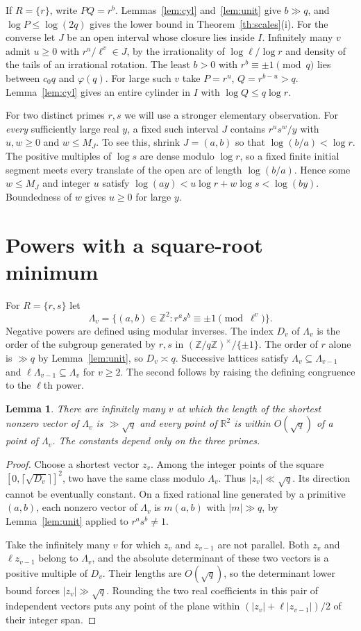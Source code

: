 \documentclass[11pt]{article}
\newtheorem{lemma}[theorem]{Lemma}
\newcommand{\R}{\mathbb R}
\newcommand{\Z}{\mathbb Z}
\newcommand{\sgnunit}{\{\pm1\}}
\begin{document}
If $R=\{r\}$, write $P Q=r^b$. Lemmas~\ref{lem:cyl} and~\ref{lem:unit}
give $b\gg q$, and $\log P\le\log(2q)$ gives the lower bound in
Theorem~\ref{th:scales}(i). For the converse let $J$ be an open interval
whose closure lies inside $I$. Infinitely many $v$ admit $u\ge0$ with
$r^u/\ell^v\in J$, by the irrationality of $\log\ell/\log r$ and density
of the tails of an irrational rotation. The least $b>0$ with
$r^b\equiv\pm1\pmod q$ lies between $c_0q$ and $\varphi(q)$. For large
such $v$ take $P=r^u$, $Q=r^{b-u}>q$. Lemma~\ref{lem:cyl} gives an
entire cylinder in $I$ with $\log Q\le q\log r$.

For two distinct primes $r,s$ we will use a stronger elementary
observation. For \emph{every} sufficiently large real $y$, a fixed such
interval $J$ contains $r^u s^w/y$ with $u,w\ge0$ and $w\le M_J$.
To see this, shrink $J=(a,b)$ so that $\log(b/a)<\log r$.
The positive multiples of $\log s$ are dense modulo $\log r$, so a
fixed finite initial segment meets every translate of the open arc of
length $\log(b/a)$. Hence some $w\le M_J$ and integer $u$ satisfy
$\log(ay)<u\log r+w\log s<\log(by)$. Boundedness of $w$ gives $u\ge0$
for large $y$.

\section{Powers with a square-root minimum}
For $R=\{r,s\}$ let
\[
 \Lambda_v=\{(a,b)\in\Z^2:r^a s^b\equiv\pm1\pmod{\ell^v}\}.
\]
Negative powers are defined using modular inverses. The index $D_v$ of
$\Lambda_v$ is the order of the subgroup generated by $r,s$ in
$(\Z/q\Z)^\times/\sgnunit$. The order of $r$ alone is $\gg q$ by
Lemma~\ref{lem:unit}, so $D_v\asymp q$. Successive lattices satisfy
$\Lambda_v\subseteq\Lambda_{v-1}$ and
$\ell\Lambda_{v-1}\subseteq\Lambda_v$ for $v\ge2$. The second follows
by raising the defining congruence to the $\ell$th power.

\begin{lemma}\label{lem:balanced}
There are infinitely many $v$ at which the length of the shortest
nonzero vector of $\Lambda_v$ is $\gg\sqrt q$ and every point of $\R^2$
is within $O(\sqrt q)$ of a point of $\Lambda_v$. The constants depend
only on the three primes.
\end{lemma}
\begin{proof}
Choose a shortest vector $z_v$. Among the integer points of the square
$[0,\lceil\sqrt{D_v}\rceil]^2$, two have the same class modulo
$\Lambda_v$. Thus $|z_v|\ll\sqrt q$. Its direction cannot be eventually
constant. On a fixed rational line generated by a primitive $(a,b)$,
each nonzero vector of $\Lambda_v$ is $m(a,b)$ with $|m|\gg q$, by
Lemma~\ref{lem:unit} applied to $r^a s^b\ne1$.

Take the infinitely many $v$ for which $z_v$ and $z_{v-1}$ are not
parallel. Both $z_v$ and $\ell z_{v-1}$ belong to $\Lambda_v$, and the
absolute determinant of these two vectors is a positive multiple of
$D_v$. Their lengths are $O(\sqrt q)$, so the determinant lower bound
forces $|z_v|\gg\sqrt q$. Rounding the two real coefficients in this
pair of independent vectors puts any point of the plane within
$(|z_v|+\ell|z_{v-1}|)/2$ of their integer span.
\end{proof}
\end{document}
